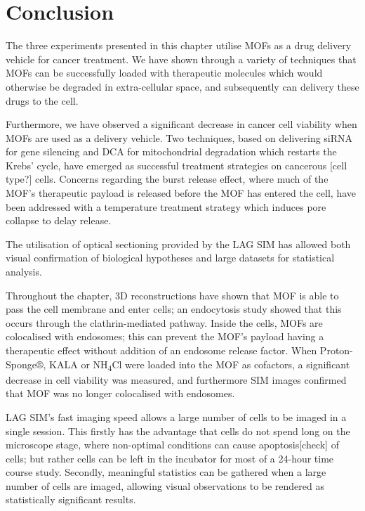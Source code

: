 \section{Conclusion} \label{sec:mof-conclusion}
The three experiments presented in this chapter utilise MOFs as a drug delivery vehicle for cancer treatment. 
We have shown through a variety of techniques that MOFs can be successfully loaded with therapeutic molecules which would otherwise be degraded in extra-cellular space, and subsequently can delivery these drugs to the cell. 

Furthermore, we have observed a significant decrease in cancer cell viability when MOFs are used as a delivery vehicle. 
Two techniques, based on delivering siRNA for gene silencing and DCA for mitochondrial degradation which restarts the Krebs' cycle, have emerged as successful treatment strategies on cancerous [cell type?] cells. 
Concerns regarding the burst release effect, where much of the MOF's therapeutic payload is released before the MOF has entered the cell, have been addressed with a temperature treatment strategy which induces pore collapse to delay release. 

The utilisation of optical sectioning provided by the LAG SIM has allowed both visual confirmation of biological hypotheses and large datasets for statistical analysis. 

Throughout the chapter, 3D reconstructions have shown that MOF is able to pass the cell membrane and enter cells; an endocytosis study showed that this occurs through the clathrin-mediated pathway. 
Inside the cells, MOFs are colocalised with endosomes; this can prevent the MOF's payload having a therapeutic effect without addition of an endosome release factor. 
When Proton-Sponge®, KALA or NH\textsubscript{4}Cl were loaded into the MOF as cofactors, a significant decrease in cell viability was measured, and furthermore SIM images confirmed that MOF was no longer colocalised with endosomes. 

LAG SIM's fast imaging speed allows a large number of cells to be imaged in a single session. 
This firstly has the advantage that cells do not spend long on the microscope stage, where non-optimal conditions can cause apoptosis[check] of cells; but rather cells can be left in the incubator for most of a 24-hour time course study. 
Secondly, meaningful statistics can be gathered when a large number of cells are imaged, allowing visual observations to be rendered as statistically significant results.

